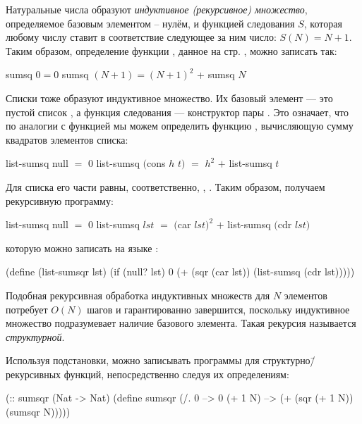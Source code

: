 Натуральные числа образуют \emph{индуктивное (рекурсивное) множество}, определяемое базовым элементом -- нулём, и функцией следования $S$, которая любому числу ставит в соответствие следующее за ним число: $S(N)=N+1$. 
Таким образом, определение функции , данное на стр. \pageref{sumsq}, можно записать так:

\begin{SchemeCode}
  sumsq $0 = 0$
  sumsq $(N + 1) = (N+1)^2$ + sumsq $N$
\end{SchemeCode}

Списки тоже образуют индуктивное множество. Их базовый элемент --- это пустой список , а функция следования --- конструктор пары . 
Это означает, что по аналогии с функцией  мы можем определить функцию , вычисляющую сумму квадратов элементов списка:

\begin{SchemeCode}
  list-sumsq null $=$ $0$
  list-sumsq $($cons $h$ $t)$ $=$ $h^2$ $+$ list-sumsq $t$
\end{SchemeCode}

Для списка  его части равны, соответственно, , . Таким образом, получаем рекурсивную программу:

\begin{SchemeCode}
  list-sumsq null $=$ $0$
  list-sumsq $lst$ $=$ $($car $lst)^2$ $+$ list-sumsq $($cdr $lst)$
\end{SchemeCode}
которую можно записать на языке \Scheme:
\begin{SchemeCode}[emph={lst}]
(define (list-sumsqr lst)
  (if (null? lst)
      0
      (+ (sqr (car lst)) (list-sumsq (cdr lst)))))
\end{SchemeCode}

Подобная рекурсивная обработка индуктивных множеств для $N$ элементов потребует $O(N)$ шагов и гарантированно завершится, поскольку индуктивное множество подразумевает наличие базового элемента. Такая рекурсия называется \emph{структурной}.

%
Используя подстановки, можно записывать программы для структурно\=/рекурсивных функций, непосредственно следуя их определениям:

\begin{SchemeCode}[emph={N}]
(:: sumsqr (Nat -> Nat)
 (define sumsqr
   (/. 0 --> 0
       (+ 1 N) --> (+ (sqr (+ 1 N)) (sumsqr N)))))
\end{SchemeCode}

